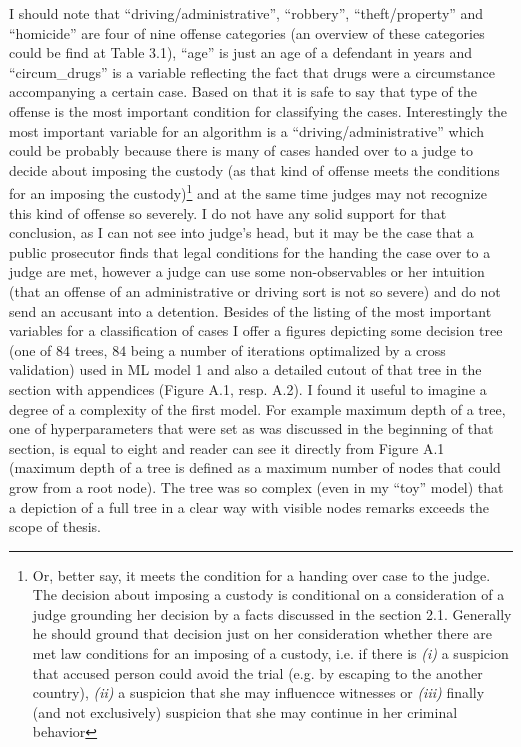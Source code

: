 \documentclass[12pt, twoside,openany]{book} %
\begin{document}
 I should note that  “driving/administrative”, “robbery”, “theft/property” and “homicide” are four of nine offense categories (an overview of these categories could be find at Table 3.1), “age” is just an age of a defendant in years and  “circum\_drugs” is a variable reflecting the fact that drugs were a circumstance accompanying a certain case. Based on that it is safe to say that type of the offense is the most important condition for classifying the cases. Interestingly the most important variable for an algorithm is a “driving/administrative” which could be probably because there is many of cases handed over to a judge to decide about imposing the custody (as that kind of offense meets the conditions for an imposing the custody)\footnote{Or, better say, it meets the condition for a handing over case to the judge. The decision about imposing a custody is conditional on a consideration of a judge grounding her decision by a facts discussed in the section 2.1. Generally he should ground that decision just on her consideration whether there are met law conditions for an imposing of a custody, i.e. if there is \textit{(i)} a suspicion that accused person could avoid the trial (e.g. by escaping to the another country), \textit{(ii)} a suspicion that she may influencce witnesses or \textit{(iii)} finally (and not exclusively) suspicion that she may continue in her criminal behavior} and at the same time judges may not recognize this kind of offense so severely. I do not have any solid support for that conclusion, as I can not see into judge's head, but it may be the case that a public prosecutor finds that legal conditions for the handing the case over to a judge are met, however a judge can use some non-observables or her intuition (that an offense of an administrative or driving sort is not so severe) and do not send an accusant into a detention.\newline
Besides of the listing of the most important variables for a classification of cases I offer a figures depicting some decision tree (one of $84$ trees, $84$ being a number of iterations optimalized by a cross validation) used in ML model 1 and also a detailed cutout of that tree in the section with appendices (Figure A.1, resp. A.2). I found it useful to imagine a degree of a complexity of the first model. For example maximum depth of a tree, one of hyperparameters that were set as was discussed in the beginning of that section, is equal to eight and reader can see it directly from Figure A.1 (maximum depth of a tree is defined as a maximum number of nodes that could grow from a root node). The tree was so complex (even in my “toy” model) that a depiction of a full tree in a clear way with visible nodes remarks exceeds the scope of thesis.\newline
\end{document}
